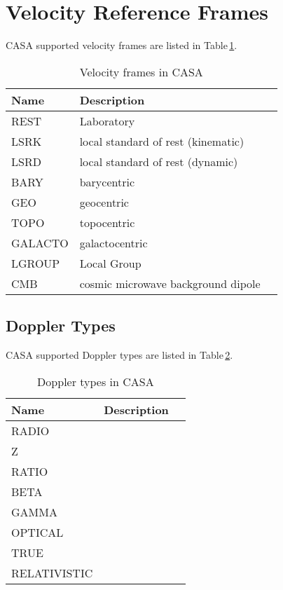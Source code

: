 \section{Velocity Reference Frames}
\label{section:conv.vel}

CASA supported velocity frames are listed in Table\,\ref{table:conv.velocityframes}.


\begin{table}[htb]
\caption{Velocity frames in CASA \label{table:conv.velocityframes}}
\begin{center}
\begin{tabular}{lll}
Name & Description\\
\hline
REST &  Laboratory\\
LSRK &  local standard of rest (kinematic)\\
LSRD &  local standard of rest (dynamic)\\
BARY &  barycentric\\
GEO &  geocentric\\
TOPO &  topocentric\\
GALACTO &  galactocentric\\
LGROUP &  Local Group\\
CMB &  cosmic microwave background dipole\\
\end{tabular}
\end{center}
\end{table}



\subsection{Doppler Types}
\label{section:conv.doppler}

CASA supported Doppler types are listed in Table\,\ref{table:conv.doppler}.


\begin{table}[htb]
\caption{Doppler types in CASA \label{table:conv.doppler}}
\begin{center}
\begin{tabular}{lll}
Name & Description\\
\hline
RADIO 	& \\
Z 	& \\
RATIO 	& \\
BETA 	& \\
GAMMA 	& \\
OPTICAL & \\	
TRUE 	& \\
RELATIVISTIC & \\ 
\end{tabular}
\end{center}
\end{table}


